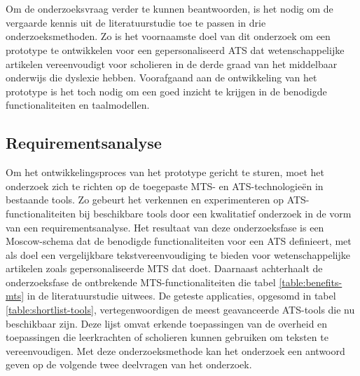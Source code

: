 
\chapter{}%
\label{ch:methodologie}


Om de onderzoeksvraag verder te kunnen beantwoorden, is het nodig om de vergaarde kennis uit de literatuurstudie toe te passen in drie onderzoeksmethoden. Zo is het voornaamste doel van dit onderzoek om een prototype te ontwikkelen voor een gepersonaliseerd ATS dat wetenschappelijke artikelen vereenvoudigt voor scholieren in de derde graad van het middelbaar onderwijs die dyslexie hebben. Voorafgaand aan de ontwikkeling van het prototype is het toch nodig om een goed inzicht te krijgen in de benodigde functionaliteiten en taalmodellen.

\section{Requirementsanalyse}
\label{sec:requirementsanalyse}

Om het ontwikkelingsproces van het prototype gericht te sturen, moet het onderzoek zich te richten op de toegepaste MTS- en ATS-technologieën in bestaande tools. Zo gebeurt het verkennen en experimenteren op ATS-functionaliteiten bij beschikbare tools door een kwalitatief onderzoek in de vorm van een requirementsanalyse. Het resultaat van deze onderzoeksfase is een Moscow-schema dat de benodigde functionaliteiten voor een ATS definieert, met als doel een vergelijkbare tekstvereenvoudiging te bieden voor wetenschappelijke artikelen zoals gepersonaliseerde MTS dat doet. Daarnaast achterhaalt de onderzoeksfase de ontbrekende MTS-functionaliteiten die tabel \ref{table:benefits-mts} in de literatuurstudie uitwees. De geteste applicaties, opgesomd in tabel \ref{table:shortlist-tools}, vertegenwoordigen de meest geavanceerde ATS-tools die nu beschikbaar zijn. Deze lijst omvat erkende toepassingen van de overheid en toepassingen die leerkrachten of scholieren kunnen gebruiken om teksten te vereenvoudigen. Met deze onderzoeksmethode kan het onderzoek een antwoord geven op de volgende twee deelvragen van het onderzoek.

